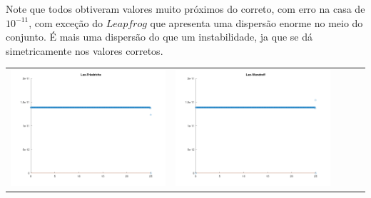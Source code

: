 \documentclass{article}
\begin{document}
Note que todos obtiveram valores muito próximos do correto, com erro na casa de $10^{-11}$, com exceção do $Leapfrog$ que apresenta uma dispersão enorme no meio do conjunto. É mais uma dispersão do que um instabilidade, ja que se dá simetricamente nos valores corretos.


\begin{table}
    \centering
        \begin{tabular}{ccccc}
            \includegraphics[scale = 0.15]{LF34.png} & \includegraphics[scale = 0.15]{LW34.png} \\

\end{tabular}
\end{table}
\end{document}
